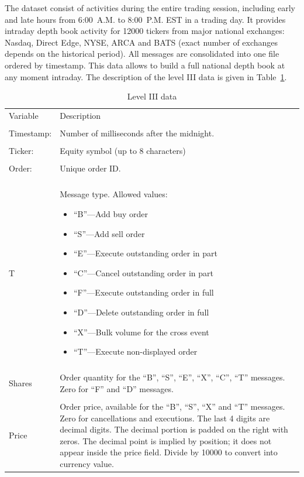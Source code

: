 The dataset consist of activities during the entire trading session, including early and late hours from 6:00~A.M. to 8:00~P.M. EST in a trading day. It provides intraday depth book activity for 12000 tickers from major national exchanges: Nasdaq, Direct Edge, NYSE, ARCA and BATS (exact number of exchanges depends on the historical period). All messages are consolidated into one file ordered by timestamp. This data allows to build a full national depth book at any moment intraday. The description of the level III data is given in Table~\ref{tab:level3data}. \\
	\begin{table}[!ht]
	\centering
	\caption{Level III data \label{tab:level3data}}
	\begin{tabular}{lp{}} \hline
	Variable & Description \\
	& \\
	Timestamp: & Number of milliseconds after the midnight. \\
	& \\
	Ticker: & Equity symbol (up to 8 characters) \\
	& \\
	Order: & Unique order ID. \\
	& \\
	T & Message type. Allowed values: \newline \begin{minipage}[t]{0.6\textwidth} \begin{itemize} \item ``B''---Add buy order \item ``S''---Add sell order \item ``E''---Execute outstanding order in part \item ``C''---Cancel outstanding order in part \item ``F''---Execute outstanding order in full \item ``D''---Delete outstanding order in full \item ``X''---Bulk volume for the cross event \item ``T''---Execute non-displayed order \end{itemize} \end{minipage} \\
	& \\
	Shares & Order quantity for the ``B'', ``S'', ``E'', ``X'', ``C'', ``T'' messages. Zero for ``F'' and ``D'' messages. \\
	& \\
	Price & Order price, available for the ``B'', ``S'', ``X'' and ``T'' messages. \newline Zero for cancellations and executions. The last 4 digits are decimal digits. The decimal portion is padded on the right with zeros. The decimal point is implied by position; it does not appear inside the price field. Divide by 10000 to convert into currency value. \\ 

\end{tabular}
\end{table}
